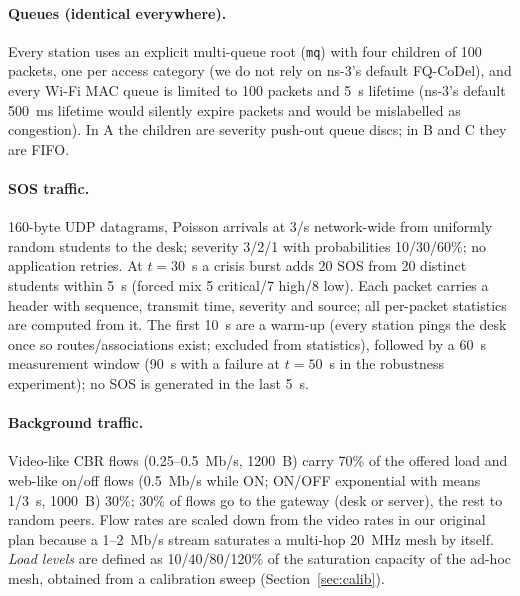 \paragraph{Queues (identical everywhere).} Every station uses an explicit multi-queue root (\texttt{mq}) with four children of 100 packets,
one per access category (we do not rely on ns-3's default FQ-CoDel), and every Wi-Fi MAC queue is limited to 100 packets and 5~s
lifetime (ns-3's default 500~ms lifetime would silently expire packets and would be mislabelled as congestion). In A the children are
severity push-out queue discs; in B and C they are FIFO.

\paragraph{SOS traffic.} 160-byte UDP datagrams, Poisson arrivals at 3/s network-wide from uniformly random students to the desk; severity 3/2/1 with
probabilities 10/30/60\%; no application retries. At $t=30$~s a crisis burst adds 20 SOS from 20 distinct students within 5~s
(forced mix 5 critical/7 high/8 low). Each packet carries a header with sequence, transmit time, severity and source; all per-packet
statistics are computed from it. The first 10~s are a warm-up (every station pings the desk once so routes/associations exist; excluded
from statistics), followed by a 60~s measurement window (90~s with a failure at $t=50$~s in the robustness experiment); no SOS is generated in
the last 5~s.

\paragraph{Background traffic.} Video-like CBR flows (0.25--0.5~Mb/s, 1200~B) carry 70\% of the offered load and web-like on/off flows
(0.5~Mb/s while ON; ON/OFF exponential with means 1/3~s, 1000~B) 30\%; 30\% of flows go to the gateway (desk or server), the rest to random peers.
Flow rates are scaled down from the video rates in our original plan because a 1--2~Mb/s stream saturates a multi-hop 20~MHz mesh by itself.
\emph{Load levels} are defined as 10/40/80/120\% of the saturation capacity of the ad-hoc mesh, obtained from a calibration sweep
(Section~\ref{sec:calib}).

